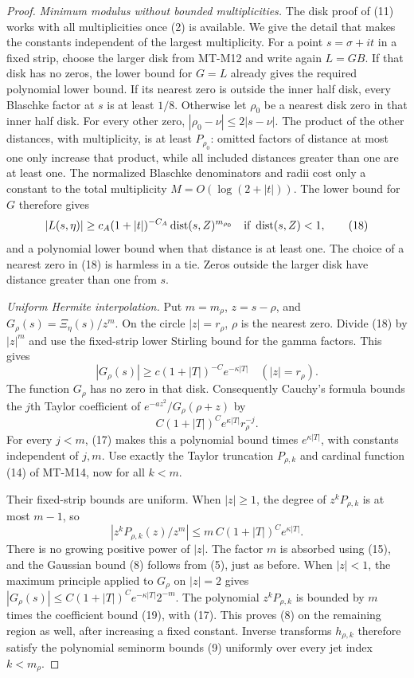 \documentclass[11pt,a4paper]{article}
\begin{document}
\begin{proof}
\emph{Minimum modulus without bounded multiplicities.}
The disk proof of (11) works with all multiplicities once
(2) is available. We give the detail that makes the
constants independent of the largest multiplicity.
For a point $s=\sigma+it$ in a fixed strip, choose the
larger disk from MT-M12 and write again $L=GB$.
If that disk has no zeros, the lower bound for $G=L$
already gives the required polynomial lower bound.
If its nearest zero is outside the inner half disk,
every Blaschke factor at $s$ is at least $1/8$.
Otherwise let $\rho_0$ be a nearest disk zero in that
inner half disk. For every other zero,
$|\rho_0-\nu|\le2|s-\nu|$.
The product of the other distances, with multiplicity,
is at least $P_{\rho_0}$: omitted factors of distance
at most one only increase that product, while all
included distances greater than one are at least one.
The normalized Blaschke denominators and radii cost
only a constant to the total multiplicity
$M=O(\log(2+|t|))$. The lower bound for $G$ therefore
gives
\[
 |L(s,\eta)|\ge c_A(1+|t|)^{-C_A}
             \operatorname{dist}(s,Z)^{m_{\rho_0}}
                       \quad\hbox{if }\operatorname{dist}(s,Z)<1,
                                                               \tag{18}
\]
and a polynomial lower bound when that distance is
at least one. The choice of a nearest zero in (18)
is harmless in a tie. Zeros outside the larger disk
have distance greater than one from $s$.

\emph{Uniform Hermite interpolation.}
Put $m=m_\rho$, $z=s-\rho$, and
$G_\rho(s)=\Xi_\eta(s)/z^m$.
On the circle $|z|=r_\rho$, $\rho$ is the nearest zero.
Divide (18) by $|z|^m$ and use the fixed-strip lower
Stirling bound for the gamma factors. This gives
\[
             |G_\rho(s)|\ge
                 c(1+|T|)^{-C}e^{-\kappa|T|}
                            \quad(|z|=r_\rho).
\]
The function $G_\rho$ has no zero in that disk.
Consequently Cauchy's formula bounds the $j$th Taylor
coefficient of $e^{-az^2}/G_\rho(\rho+z)$ by
\[
       C(1+|T|)^C e^{\kappa|T|}r_\rho^{-j}.
                                                               \tag{19}
\]
For every $j<m$, (17) makes this a polynomial bound
times $e^{\kappa|T|}$, with constants independent of $j,m$.
Use exactly the Taylor truncation $P_{\rho,k}$ and
cardinal function (14) of MT-M14, now for all $k<m$.

Their fixed-strip bounds are uniform. When $|z|\ge1$,
the degree of $z^kP_{\rho,k}$ is at most $m-1$, so
\[
 |z^kP_{\rho,k}(z)/z^m|
       \le m\,C(1+|T|)^C e^{\kappa|T|}.
 \]
There is no growing positive power of $|z|$.
The factor $m$ is absorbed using (15), and the Gaussian
bound (8) follows from (5), just as before.
When $|z|<1$, the maximum principle applied to
$G_\rho$ on $|z|=2$ gives
$|G_\rho(s)|\le C(1+|T|)^C e^{-\kappa|T|}2^{-m}$.
The polynomial $z^kP_{\rho,k}$ is bounded by
$m$ times the coefficient bound (19), with (17).
This proves (8) on the remaining region as well,
after increasing a fixed constant.
Inverse transforms $h_{\rho,k}$ therefore satisfy
the polynomial seminorm bounds (9) uniformly over
every jet index $k<m_\rho$.


\end{proof}
\end{document}
